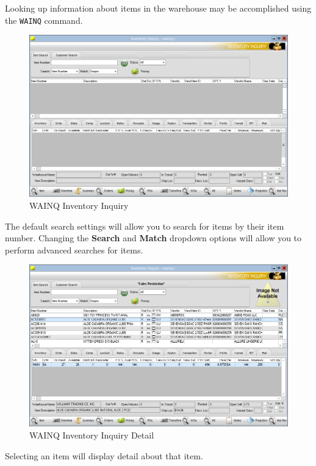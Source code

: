 
Looking up information about items in the warehouse may be accomplished using the \texttt{WAINQ} command.

\begin{figure}[H]
	\includegraphics[width=\textwidth]{../img/image53}
	\caption{WAINQ Inventory Inquiry}
\end{figure}

The default search settings will allow you to search for items by their item number. Changing the \textbf{Search} and \textbf{Match} dropdown options will allow you to perform advanced searches for items.

\begin{figure}[H]
	\includegraphics[width=\textwidth]{../img/image54}
	\caption{WAINQ Inventory Inquiry Detail}
\end{figure}

Selecting an item will display detail about that item.

